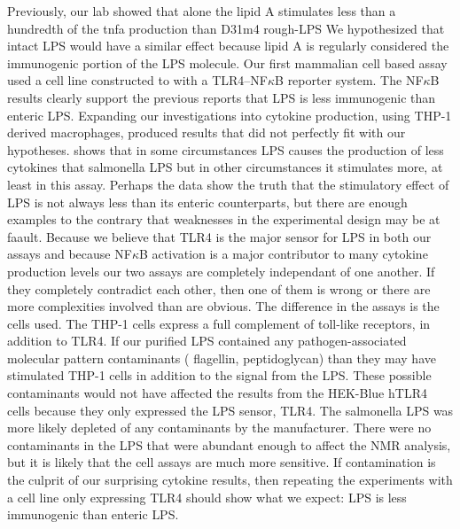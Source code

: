 Previously, our lab showed that alone the \caulobacter{} lipid A stimulates less than a hundredth of the \ac{tnfa} production than \ecoli{} D31m4 rough-\ac{LPS} We hypothesized that intact \caulobacter{} \ac{LPS} would have a similar effect because lipid A is regularly considered the immunogenic portion of the \ac{LPS} molecule. Our first mammalian cell based assay used a cell line constructed to with a TLR4--NF$\kappa$B reporter system. The NF$\kappa$B results clearly support the previous reports that \caulobacter{} \ac{LPS} is less immunogenic than enteric \ac{LPS}. Expanding our investigations into cytokine production, using THP-1 derived macrophages, produced results that  did not perfectly fit with our hypotheses.  shows that in some  circumstances \caulobacter{} \ac{LPS} causes the production of less cytokines that \ac{salmonella} \ac{LPS} but in other circumstances it stimulates more, at least in this assay. Perhaps the data show the truth that the stimulatory effect of \caulobacter{} \ac{LPS} is not always less than its enteric counterparts, but there are enough examples to the contrary that weaknesses in the experimental design may be at faault. Because we believe that TLR4 is the major sensor for \ac{LPS} in both our assays and because NF$\kappa$B activation is a major contributor to many cytokine production levels our two assays are completely independant of one another. If they completely contradict each other, then one of them is wrong or there are more complexities involved than are obvious. The difference in the assays is the cells used. The THP-1 cells express a full complement of toll-like receptors, in addition to TLR4. If our purified \caulobacter{} \ac{LPS} contained any pathogen-associated molecular pattern contaminants (\eg{} flagellin, peptidoglycan) than they may have stimulated THP-1 cells in addition to the signal from the \ac{LPS}. These possible contaminants would not have affected the results from the HEK-Blue hTLR4 cells because they only expressed the \ac{LPS} sensor, TLR4. The  \ac{salmonella} \ac{LPS} was more likely depleted of any contaminants by the manufacturer. There were no contaminants in the \caulobacter{} \ac{LPS} that were abundant enough to affect the \ac{NMR} analysis, but it is likely that the cell assays are  much more sensitive. If contamination is the culprit of our surprising cytokine results, then repeating the experiments with a cell line only expressing TLR4 should show what we expect: \caulobacter{} \ac{LPS} is less immunogenic than enteric \ac{LPS}.